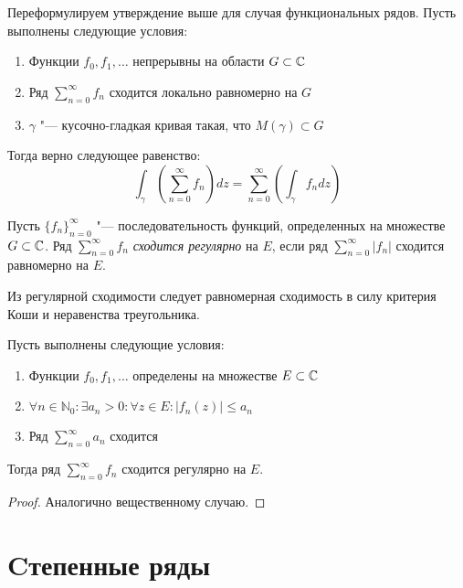 \begin{note}
	Переформулируем утверждение выше для случая функциональных рядов. Пусть выполнены следующие условия:
	\begin{enumerate}
		\item Функции $f_0, f_1, \dotsc$ непрерывны на области $G \subset \mathbb{C}$
		\item Ряд $\sum_{n=0}^\infty f_n$ сходится локально равномерно на $G$
		\item $\gamma$ "--- кусочно-гладкая кривая такая, что $M(\gamma) \subset G$
	\end{enumerate}
	
	Тогда верно следующее равенство:
	\[\int_\gamma \left(\sum_{n=0}^\infty f_n\right)dz = \sum_{n=0}^\infty \left(\int_\gamma f_ndz\right)\]
\end{note}

\begin{definition}
	Пусть $\{f_n\}_{n = 0}^\infty$ "--- последовательность функций, определенных на множестве $G \subset \mathbb{C}$. Ряд $\sum_{n=0}^\infty f_n$ \textit{сходится регулярно} на $E$, если ряд $\sum_{n=0}^\infty |f_n|$ сходится равномерно на $E$.
\end{definition}

\begin{note}
	Из регулярной сходимости следует равномерная сходимость в силу критерия Коши и неравенства треугольника.
\end{note}

\begin{theorem}
	Пусть выполнены следующие условия:
	\begin{enumerate}
		\item Функции $f_0, f_1, \dotsc$ определены на множестве $E \subset \mathbb{C}$
		\item $\forall n \in \mathbb{N}_0 : \exists a_n > 0: \forall z \in E: |f_n(z)| \le a_n$
		\item Ряд $\sum_{n=0}^\infty a_n$ сходится
	\end{enumerate}
	
	Тогда ряд $\sum_{n=0}^\infty f_n$ сходится регулярно на $E$.
\end{theorem}

\begin{proof}
	Аналогично вещественному случаю.
\end{proof}

\section{Cтепенные ряды}

